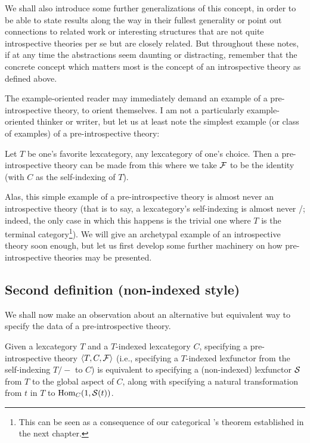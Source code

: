 \documentclass[./main.tex]{subfiles}
\begin{document}
We shall also introduce some further generalizations of this concept, in order to be able to state results along the way in their fullest generality or point out connections to related work or interesting structures that are not quite introspective theories per se but are closely related. But throughout these notes, if at any time the abstractions seem daunting or distracting, remember that the concrete concept which matters most is the concept of an introspective theory as defined above.

The example-oriented reader may immediately demand an example of a pre-introspective theory, to orient themselves. I am not a particularly example-oriented thinker or writer, but let us at least note the simplest example (or class of examples) of a pre-introspective theory:

\begin{example} \label{TrivialPreIntrospIndexed}
Let $T$ be one's favorite lexcategory, any lexcategory of one's choice. Then a pre-introspective theory can be made from this where we take $\mathcal{F}$ to be the identity (with $C$ as the self-indexing of $T$).
\end{example}

Alas, this simple example of a pre-introspective theory is almost never an introspective theory (that is to say, a lexcategory's self-indexing is almost never \repsmall/; indeed, the only case in which this happens is the trivial one where $T$ is the terminal category\footnote{This can be seen as a consequence of our categorical \Loeb's theorem established in the next chapter.}). We will give an archetypal example of an introspective theory soon enough, but let us first develop some further machinery on how pre-introspective theories may be presented.

\subsection{Second definition (non-indexed style)}

We shall now make an observation about an alternative but equivalent way to specify the data of a pre-introspective theory.

\begin{theorem}\label{SNCorrespondence}
Given a lexcategory $T$ and a $T$-indexed lexcategory $C$, specifying a pre-introspective theory $\langle T, C, \mathcal{F} \rangle$ (i.e., specifying a $T$-indexed lexfunctor from the self-indexing $T/-$ to $C$) is equivalent to specifying a (non-indexed) lexfunctor $\mathcal{S}$ from $T$ to the global aspect of $C$, along with specifying a natural transformation from $t$ in $T$ to $\operatorname{Hom}_C(1, \mathcal{S}(t))$.
\end{theorem}
\end{document}
